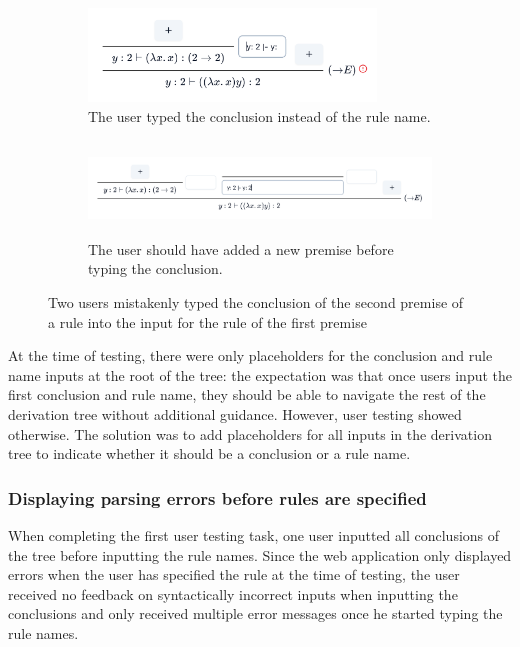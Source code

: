 \begin{figure}[!htbp]
    \centering
    \begin{subfigure}{\textwidth}
        \centering
        \includegraphics[height=2.5cm]{evaluation/premise-input-wrong.png}
        \caption{The user typed the conclusion instead of the rule name.}
    \end{subfigure}%
    \newline
    \begin{subfigure}{\textwidth}
        \centering
        \includegraphics[height=2.5cm]{evaluation/premise-input-correct.png}
        \caption{The user should have added a new premise before typing the conclusion.}
    \end{subfigure}
    \caption{Two users mistakenly typed the conclusion of the second premise of a rule into the input for the rule of the first premise}
    \label{fig:evaluation:wrong-premise-input}
\end{figure}

At the time of testing, there were only placeholders for the conclusion and rule name inputs at the root of the tree: the expectation was that once users input the first conclusion and rule name, they should be able to navigate the rest of the derivation tree without additional guidance. However, user testing showed otherwise. The solution was to add placeholders for all inputs in the derivation tree to indicate whether it should be a conclusion or a rule name.

\subsubsection{Displaying parsing errors before rules are specified}
When completing the first user testing task, one user inputted all conclusions of the tree before inputting the rule names. Since the web application only displayed errors when the user has specified the rule at the time of testing, the user received no feedback on syntactically incorrect inputs when inputting the conclusions and only received multiple error messages once he started typing the rule names.

